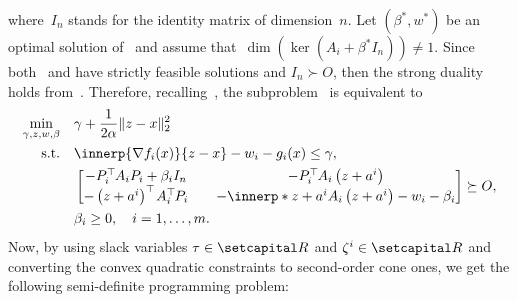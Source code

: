 \documentclass[../../main]{subfiles}
\begin{document}
where~$I_n$ stands for the identity matrix of dimension~$n$.
Let $(\beta^\ast, w^\ast)$ be an optimal solution of~ and assume that~$\dim(\ker(A_i + \beta^\ast I_n)) \neq 1$.
Since both~ and  have strictly feasible solutions and $I_n \succ O$, then the strong duality holds from~\cite[Theorem~3.5]{Beck2006}.
Therefore, recalling~, the subproblem~ is equivalent to
\begin{equation}
    \begin{aligned}
        \min_{\gamma, z, w, \beta} \quad & \gamma + \frac{1}{2 \alpha} \norm{z - x}_2^2 \\ 
        \st    \quad   & \innerp{\nabla f_i(x)}{z - x} - w_i - g_i (x) \leq \gamma, \\
                       & \begin{bmatrix}
                           -P_i^\T A_i P_i + \beta_i I_n &\quad -P_i^\T A_i \left(z + a^i\right) \\
                           -\left(z + a^i\right)^\T A_i^\T P_i &\quad -\innerp*{z + a^i}{A_i \left(z + a^i\right)} - w_i -\beta_i
                       \end{bmatrix} 
                       \succeq O, \\
                       & \beta_i \geq 0, \quad i = 1,\dots,m.
    \end{aligned}
\end{equation}
Now, by using slack variables $\tau \in \setR$ and $\zeta^i \in \setR$ and converting the convex quadratic constraints to second-order cone ones, we get the following semi-definite programming problem:
\end{document}
